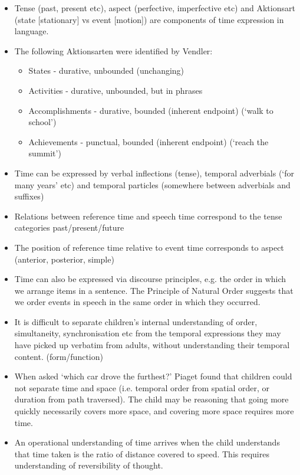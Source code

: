 \documentclass{article}
\begin{document}
\begin{itemize}
    \item Tense (past, present etc), aspect (perfective, imperfective etc) and Aktionsart (state [stationary] vs event [motion]) are components of time expression in language.
    \item The following Aktionsarten were identified by Vendler:
    \begin{itemize}
        \item States - durative, unbounded (unchanging)
        \item Activities - durative, unbounded, but in phrases
        \item Accomplishments - durative, bounded (inherent endpoint) (`walk to school')
        \item Achievements - punctual, bounded (inherent endpoint) (`reach the summit')
    \end{itemize}
    \item Time can be expressed by verbal inflections (tense), temporal adverbials (`for many years' etc) and temporal particles (somewhere between adverbials and suffixes)
    \item Relations between reference time and speech time correspond to the tense categories past/present/future
    \item The position of reference time relative to event time corresponds to aspect (anterior, posterior, simple)
    \item Time can also be expressed via discourse principles, e.g. the order in which we arrange items in a sentence. The Principle of Natural Order suggests that we order events in speech in the same order in which they occurred.
    \item It is difficult to separate children's internal understanding of order, simultaneity, synchronisation etc from the temporal expressions they may have picked up verbatim from adults, without understanding their temporal content. (form/function)
    \item When asked `which car drove the furthest?' Piaget found that children could not separate time and space (i.e. temporal order from spatial order, or duration from path traversed). The child may be reasoning that going more quickly necessarily covers more space, and covering more space requires more time.
    \item An operational understanding of time arrives when the child understands that time taken is the ratio of distance covered to speed. This requires understanding of reversibility of thought.

\end{itemize}
\end{document}
